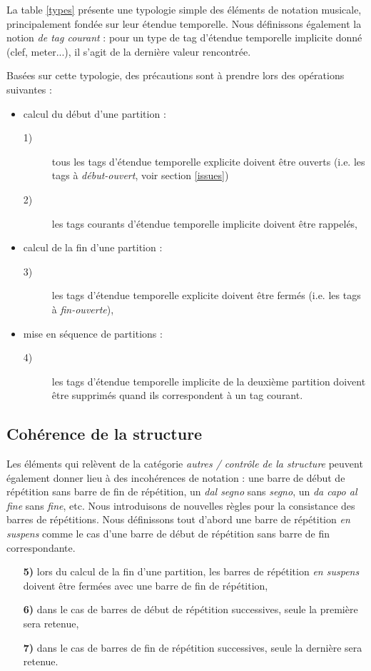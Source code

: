 \documentclass{article}
\newcommand{\oend}			{\emph{fin-ouverte}}
\newcommand{\obeg}			{\emph{début-ouvert}}
\newcommand{\rulenum}[1]	{\textbf{#1}}
\begin{document}
La table  \ref{types} présente une typologie simple des éléments de notation musicale, principalement fondée sur leur étendue temporelle. Nous définissons également la notion \emph{de tag courant} : pour un type de tag d'étendue temporelle implicite donné (clef, meter...), il s'agit de la dernière valeur rencontrée. 

Basées sur cette typologie, des précautions sont à prendre lors des opérations suivantes :

\begin{itemize}
\item calcul du début d'une partition :  
\begin{description}
	\item[1)] tous les tags d'étendue temporelle explicite doivent être ouverts (i.e. les tags à \obeg , voir section \ref{issues})
	\item[2)] les tags courants d'étendue temporelle implicite  doivent être rappelés,
\end{description}
\item calcul de la fin d'une partition : 
\begin{description}
	\item[3)] les tags d'étendue temporelle explicite doivent être fermés (i.e. les tags à \oend ),
\end{description}
\item mise en séquence de partitions : 
\begin{description}
	\item[4)] les tags d'étendue temporelle implicite de la deuxième partition doivent être supprimés quand ils correspondent à un tag courant.
\end{description}
\end{itemize}


\subsection{Cohérence de la structure} \label{sc}
Les éléments qui relèvent de la catégorie \emph{autres / contrôle de la structure} peuvent également donner lieu à des incohérences de notation : une barre de début de répétition sans barre de fin de répétition, un \emph{dal segno} sans \emph{segno}, un \emph{da capo al fine} sans \emph{fine}, etc.
Nous introduisons de nouvelles règles pour la consistance des barres de répétitions. Nous définissons tout d'abord une barre de répétition \emph{en suspens} comme le cas d'une barre de début de répétition sans barre de fin correspondante. 
\begin{itemize}
\item[\rulenum{5)}] lors du calcul de la fin d'une partition, les barres de répétition \emph{en suspens} doivent être fermées avec une barre de fin de répétition,
\item[\rulenum{6)}] dans le cas de barres de début de répétition successives, seule la première sera retenue,
\item[\rulenum{7)}] dans le cas de barres de fin de répétition successives, seule la dernière sera retenue.
\end{itemize}
\end{document}

